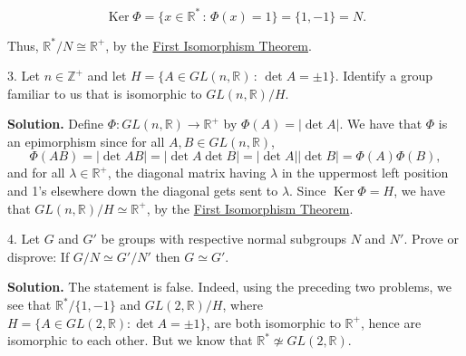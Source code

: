 \documentclass[10pt,]{book}
\theoremstyle{plain}
\theoremstyle{definition}
\theoremstyle{definition}
\theoremstyle{definition}
\theoremstyle{definition}
\numberwithin{equation}{section}
\def\Z{\mathbb{Z}}
\def\R{\mathbb{R}}
\DeclareMathOperator{\Ker}{Ker}
\begin{document}
\begin{exerciselist}
\begin{equation*}
\Ker \Phi=\{x\in \R^*\,:\,\Phi(x)=1\}=\{1,-1\}=N.
\end{equation*}
%
\par
Thus, \(\R^*/N \cong \R^+\), by the \hyperref[fit]{First Isomorphism Theorem}.%
\item[3.]\hypertarget{exercise-65}{}Let \(n\in \Z^+\) and let \(H=\{A\in GL(n,\R)\,:\, \det A =\pm
1\}\). Identify a group familiar to us that is isomorphic to \(GL(n,\R)/H\).%
\par\smallskip
\par\smallskip
\noindent\textbf{Solution.}\hypertarget{solution-65}{}\quad
Define \(\Phi:GL(n,\R)\to \R^+\) by \(\Phi(A)=|\det A|\). We have that \(\Phi\) is an epimorphism since for all \(A,B\in GL(n,\R)\),%
\begin{equation*}
\Phi(AB)=|\det AB|=|\det A \det B|=|\det
A||\det B|=\Phi(A)\Phi(B),
\end{equation*}
and for all \(\lambda \in \R^+\), the diagonal matrix having \(\lambda\) in the uppermost left position and 1's elsewhere down the diagonal gets sent to \(\lambda\). Since \(\Ker
\Phi=H\), we have that \(GL(n,\R)/H \simeq \R^+\), by the \hyperref[fit]{First Isomorphism Theorem}.%
\item[4.]\hypertarget{exercise-66}{}Let \(G\) and \(G'\) be groups with respective normal subgroups \(N\) and \(N'\). Prove or disprove: If \(G/N\simeq G'/N'\) then \(G\simeq
G'\).%
\par\smallskip
\par\smallskip
\noindent\textbf{Solution.}\hypertarget{solution-66}{}\quad
The statement is false. Indeed, using the preceding two problems, we see that \(\R^*/\{1,-1\}\) and \(GL(2,\R)/H\), where \(H=\{A\in GL(2,\R):\det A =\pm 1\}\), are both isomorphic to \(\R^+\), hence are isomorphic to each other. But we know that \(\R^* \not\simeq GL(2,\R)\).%
\end{exerciselist}
%
%
%
\appendix
%
\typeout{************************************************}
\typeout{************************************************}
\end{document}
